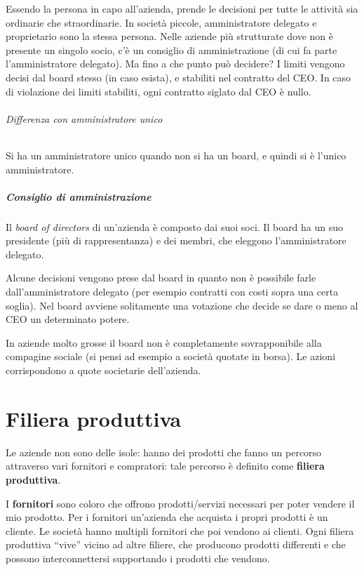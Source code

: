 Essendo la persona in capo all'azienda, prende le decisioni per tutte le
attività sia ordinarie che straordinarie. In società piccole,
amministratore delegato e proprietario sono la stessa persona. Nelle
aziende più strutturate dove non è presente un singolo socio, c'è un
consiglio di amministrazione (di cui fa parte l'amministratore delegato).
Ma fino a che punto può decidere? I limiti vengono decisi dal board stesso (in
caso esista), e stabiliti nel contratto del CEO. In caso di violazione dei
limiti stabiliti, ogni contratto siglato dal CEO è nullo.

\subparagraph*{Differenza con amministratore unico} Si ha un amministratore
unico quando non si ha un board, e quindi si è l'unico amministratore.

\paragraph*{Consiglio di amministrazione} Il \textit{board of directors} di
un'azienda è composto dai suoi soci. Il board ha un suo presidente (più di
rappresentanza) e dei membri, che eleggono l'amministratore delegato.

Alcune decisioni vengono prese dal board in quanto non è possibile farle
dall'amministratore delegato (per esempio contratti con costi sopra una certa
soglia). Nel board avviene solitamente una votazione che decide se dare o meno
al CEO un determinato potere.

In aziende molto grosse il board non è completamente sovrapponibile alla
compagine sociale (si pensi ad esempio a società quotate in borsa). Le azioni
corrispondono a quote societarie dell'azienda.

\chapter{Filiera produttiva}


Le aziende non sono delle isole: hanno dei prodotti che fanno un percorso
attraverso vari fornitori e compratori: tale percorso è definito come
\textbf{filiera produttiva}.

I \textbf{fornitori} sono coloro che offrono prodotti/servizi necessari per
poter vendere il mio prodotto. Per i fornitori un'azienda che acquista i propri
prodotti è un cliente. Le società hanno multipli fornitori che poi
vendono ai clienti.
Ogni filiera produttiva ``vive'' vicino ad altre filiere,
che producono prodotti differenti e che possono interconnettersi supportando i
prodotti che vendono.

